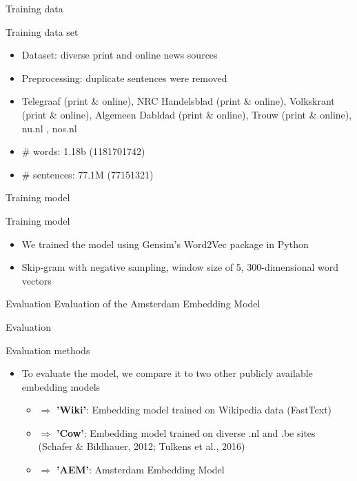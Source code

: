


\begin{frame}{Training data}
  \begin{block}{Training data set}
    \begin{itemize}
    \item Dataset: diverse print and online news sources
    \item Preprocessing: duplicate sentences were removed
    \item Telegraaf (print \& online), NRC Handelsblad (print \& online), Volkskrant (print \& online), Algemeen Dabldad (print \& online), Trouw (print \& online), nu.nl , nos.nl
    \item \# words: 1.18b (1181701742)
    \item \# sentences: 77.1M (77151321)
    \end{itemize}
  \end{block}
\end{frame}

\begin{frame}{Training model}
  \begin{block}{Training model}
    \begin{itemize}
    \item We trained the model using Gensim's Word2Vec package in Python
    \item Skip-gram with negative sampling, window size of 5, 300-dimensional word vectors
    \end{itemize}
  \end{block}
\end{frame}


\begin{frame}{Evaluation}
  Evaluation of the Amsterdam Embedding Model
\end{frame}

\begin{frame}{Evaluation}
  \begin{block}{Evaluation methods}
    \begin{itemize}
    \item To evaluate the model, we compare it to two other publicly available embedding models
      \begin{itemize}
      \item $\Rightarrow$ \textbf {'Wiki'}: Embedding model trained on Wikipedia data (FastText)
      \item $\Rightarrow$ \textbf{'Cow'}: Embedding model trained on diverse .nl and .be sites (Schafer \& Bildhauer, 2012; Tulkens et al., 2016)
      \item $\Rightarrow$ \textbf{'AEM'}: Amsterdam Embedding Model
      \end{itemize}
    \end{itemize}
  \end{block}
\end{frame}

